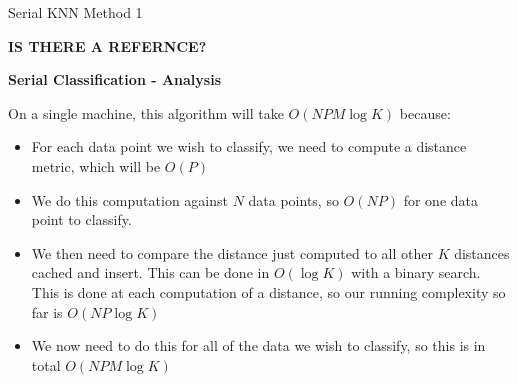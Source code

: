 \begin{algorithm}
\DontPrintSemicolon
{}
\caption{Serial KNN Method 1\label{KNN1}}
\end{algorithm}

\textbf{IS THERE A REFERNCE?}

\vspace{5 mm}
\noindent
\textbf{Serial Classification - Analysis}

\vspace{5 mm}
\noindent
On a single machine, this algorithm will take $O(N P M \log K)$ because:

\begin{itemize}
\item For each data point we wish to classify, we need to compute a distance 
metric, which will be $O(P)$
\item We do this computation against $N$ data points, so $O(N P)$ for one data 
point to classify.
\item We then need to compare the distance just computed to all other $K$ 
distances cached and insert. This can be done in $O(\log K)$ with a binary 
search. This is done at each computation of a distance, so our running 
complexity so far is $O(N P \log K)$
\item We now need to do this for all of the data we wish to classify, so this 
is in total $O(N P M \log K)$
\end{itemize}

